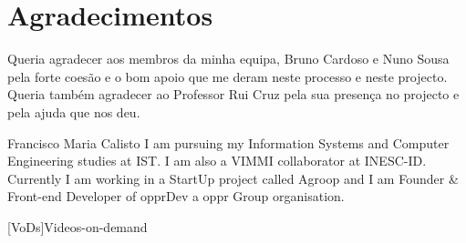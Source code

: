 \documentclass[a4paper,12pt,journal,twoside,compsoc]{PPIEEEtran}
\begin{document}
\section{Agradecimentos}

Queria agradecer aos membros da minha equipa, Bruno Cardoso e Nuno Sousa pela forte coesão e o bom apoio que me deram neste processo e neste projecto. Queria também agradecer ao Professor Rui Cruz pela sua presença no projecto e pela ajuda que nos deu.

% 
\begin{IEEEbiography}
{Francisco Maria Calisto}
I am pursuing my Information Systems and Computer  Engineering studies at \ac{IST}. I am also a \ac{VIMMI} collaborator at \ac{INESC-ID}. Currently I am working in a StartUp project called Agroop and I am Founder \& Front-end Developer of opprDev a oppr Group organisation.
\end{IEEEbiography}

	[VoDs]{Videos-on-demand}

\newpage
\onecolumn
	
\end{document}
